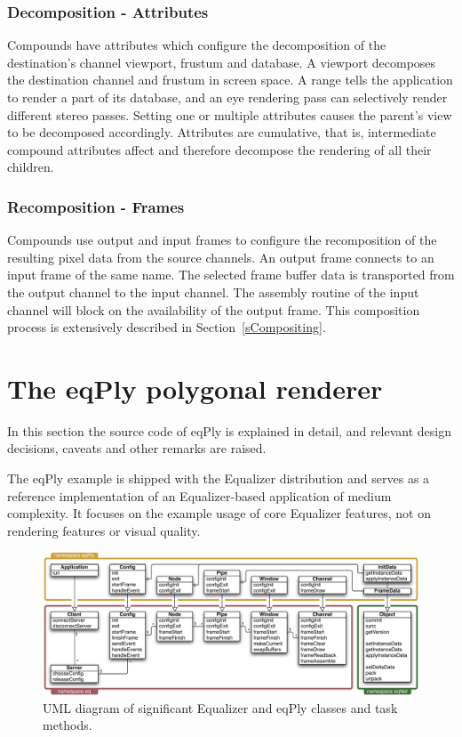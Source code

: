 \documentclass[10pt,a4]{scrartcl}
\newcommand{\sref}[1]{Section~\ref{#1}}
\begin{document}
\subsubsection{Decomposition - Attributes}
Compounds have attributes which configure the decomposition of the
destination's channel viewport, frustum and database. A
\textsf{viewport} decomposes the destination channel and frustum in
screen space. A \textsf{range} tells the application to render a part of
its database, and an \textsf{eye} rendering pass can selectively render
different stereo passes. Setting one or multiple attributes causes the
parent's view to be decomposed accordingly. Attributes are cumulative,
that is, intermediate compound attributes affect and therefore decompose
the rendering of all their children.

\subsubsection{Recomposition - Frames}
Compounds use output and input frames to configure the recomposition of
the resulting pixel data from the source channels. An output frame
connects to an input frame of the same name. The selected frame buffer
data is transported from the output channel to the input channel. The
assembly routine of the input channel will block on the availability of
the output frame. This composition process is extensively described in
\sref{sCompositing}.



\section{\label{sEqPly}The eqPly polygonal renderer}

In this section the source code of \textsf{eqPly} is explained in
detail, and relevant design decisions, caveats and other remarks are
raised.

The \textsf{eqPly} example is shipped with the Equalizer distribution
and serves as a reference implementation of an Equalizer-based
application of medium complexity. It focuses on the example usage of
core Equalizer features, not on rendering features or visual quality.

\begin{figure}[ht!]\center
  \includegraphics[width=\textwidth]{images/uml}
  {\caption{\small\label{fUml}UML diagram of significant Equalizer and
      eqPly classes and task methods.}}
\end{figure}
\end{document}
